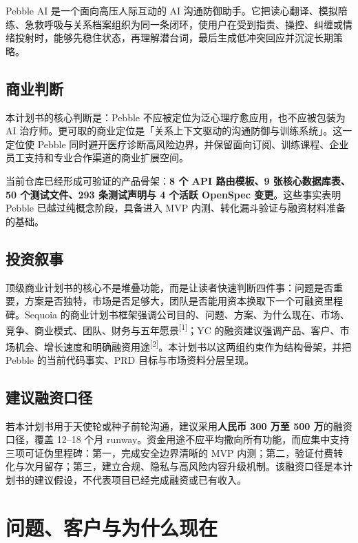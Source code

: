 \documentclass[UTF8,11pt,a4paper]{ctexart}
\newcommand{\fact}[1]{\textcolor{PebbleRock}{\textbf{#1}}}
\newcommand{\assumption}[1]{\textcolor{PebbleClay}{\textbf{#1}}}
\newcommand{\refnum}[1]{\textsuperscript{\textcolor{PebbleAccent}{[#1]}}}
\begin{document}
Pebble AI 是一个面向高压人际互动的 AI 沟通防御助手。它把读心翻译、模拟陪练、急救呼吸与关系档案组织为同一条闭环，使用户在受到指责、操控、纠缠或情绪投射时，能够先稳住状态，再理解潜台词，最后生成低冲突回应并沉淀长期策略。

\subsection{商业判断}

本计划书的核心判断是：Pebble 不应被定位为泛心理疗愈应用，也不应被包装为 AI 治疗师。更可取的商业定位是「关系上下文驱动的沟通防御与训练系统」。这一定位使 Pebble 同时避开医疗诊断高风险边界，并保留面向订阅、训练课程、企业员工支持和专业合作渠道的商业扩展空间。

当前仓库已经形成可验证的产品骨架：\fact{8 个 API 路由模板、9 张核心数据库表、50 个测试文件、293 条测试声明与 4 个活跃 OpenSpec 变更}。这些事实表明 Pebble 已越过纯概念阶段，具备进入 MVP 内测、转化漏斗验证与融资材料准备的基础。

\subsection{投资叙事}

顶级商业计划书的核心不是堆叠功能，而是让读者快速判断四件事：问题是否重要，方案是否独特，市场是否足够大，团队是否能用资本换取下一个可融资里程碑。Sequoia 的商业计划书框架强调公司目的、问题、方案、为什么现在、市场、竞争、商业模式、团队、财务与五年愿景\refnum{1}；YC 的融资建议强调产品、客户、市场机会、增长速度和明确融资用途\refnum{2}。本计划书以这两组约束作为结构骨架，并把 Pebble 的当前代码事实、PRD 目标与市场资料分层呈现。

\subsection{建议融资口径}

若本计划书用于天使轮或种子前轮沟通，建议采用\assumption{人民币 300 万至 500 万}的融资口径，覆盖 12--18 个月 runway。资金用途不应平均撒向所有功能，而应集中支持三项可证伪里程碑：第一，完成安全边界清晰的 MVP 内测；第二，验证付费转化与次月留存；第三，建立合规、隐私与高风险内容升级机制。该融资口径是本计划书的建议假设，不代表项目已经完成融资或已有收入。

\section{问题、客户与为什么现在}
\end{document}
